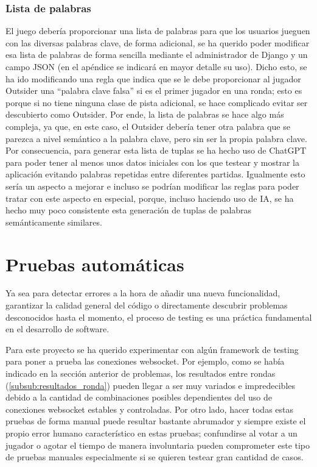 \subsubsection{Lista de palabras}
El juego debería proporcionar una lista de palabras para que los usuarios jueguen con las 
diversas palabras clave, de forma adicional, se ha querido poder modificar esa lista de palabras de forma sencilla mediante el administrador de Django y un campo JSON (en el apéndice se indicará en mayor detalle su uso).
Dicho esto, se ha ido modificando una regla que indica que se le debe proporcionar al jugador Outsider una ``palabra clave falsa'' si es el primer jugador en una ronda; esto es porque si 
no tiene ninguna clase de pista adicional, se hace complicado evitar ser descubierto como Outsider. Por ende, la lista de palabras se hace algo más compleja, ya que, en este caso, el Outsider
debería tener otra palabra que se parezca a nivel semántico a la palabra clave, pero sin ser la propia palabra clave. Por consecuencia, para generar esta lista de tuplas se ha hecho uso de ChatGPT \cite{ChatGPT} para
poder tener al menos unos datos iniciales con los que testear y mostrar la aplicación evitando palabras repetidas entre diferentes partidas. Igualmente esto sería un aspecto a mejorar e incluso
se podrían modificar las reglas para poder tratar con este aspecto en especial, porque, incluso haciendo uso de IA, se ha hecho muy poco consistente esta generación de tuplas de palabras semánticamente similares.



\section{Pruebas automáticas}

Ya sea para detectar errores a la hora de añadir una nueva funcionalidad, garantizar la calidad general del código o directamente
descubrir problemas desconocidos hasta el momento, el proceso de testing es una práctica fundamental en el desarrollo de
software.

Para este proyecto se ha querido experimentar con algún framework de testing para poner a prueba las conexiones websocket. Por ejemplo, como se había indicado
en la sección anterior de problemas, los resultados entre rondas (\ref{subsub:resultados_ronda}) pueden llegar a ser muy variados e impredecibles debido a la cantidad de combinaciones
posibles dependientes del uso de conexiones websocket estables y controladas. Por otro lado, hacer todas estas pruebas de forma manual puede resultar 
bastante abrumador y siempre existe el propio error humano característico en estas pruebas; confundirse al votar a un jugador o agotar el tiempo de manera
involuntaria pueden comprometer este tipo de pruebas manuales especialmente si se quieren testear gran cantidad de casos.

